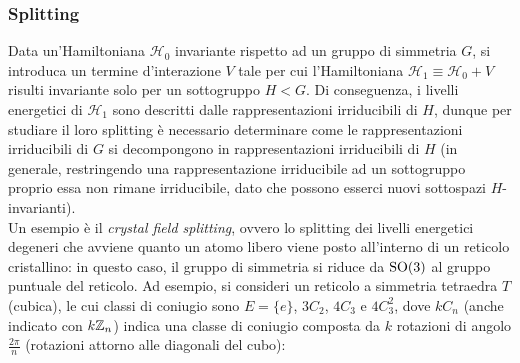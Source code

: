 \subsubsection{Splitting}

Data un'Hamiltoniana $ \mathcal{H}_0 $ invariante rispetto ad un gruppo di simmetria $ G $, si introduca un termine d'interazione $ V $ tale per cui l'Hamiltoniana $ \mathcal{H}_1 \equiv \mathcal{H}_0 + V $ risulti invariante solo per un sottogruppo $ H < G $. Di conseguenza, i livelli energetici di $ \mathcal{H}_1 $ sono descritti dalle rappresentazioni irriducibili di $ H $, dunque per studiare il loro splitting è necessario determinare come le rappresentazioni irriducibili di $ G $ si decompongono in rappresentazioni irriducibili di $ H $ (in generale, restringendo una rappresentazione irriducibile ad un sottogruppo proprio essa non rimane irriducibile, dato che possono esserci nuovi sottospazi $ H $-invarianti).\\
Un esempio è il \textit{crystal field splitting}, ovvero lo splitting dei livelli energetici degeneri che avviene quanto un atomo libero viene posto all'interno di un reticolo cristallino: in questo caso, il gruppo di simmetria si riduce da $ \mathrm{SO}(3) $ al gruppo puntuale del reticolo. Ad esempio, si consideri un reticolo a simmetria tetraedra $ T $ (cubica), le cui classi di coniugio sono $ E = \{e\} $, $ 3C_2 $, $ 4C_3 $ e $ 4C_3^2 $, dove $ kC_n $ (anche indicato con $ k\mathbb{Z}_n $) indica una classe di coniugio composta da $ k $ rotazioni di angolo $ \frac{2\pi}{n} $ (rotazioni attorno alle diagonali del cubo):

